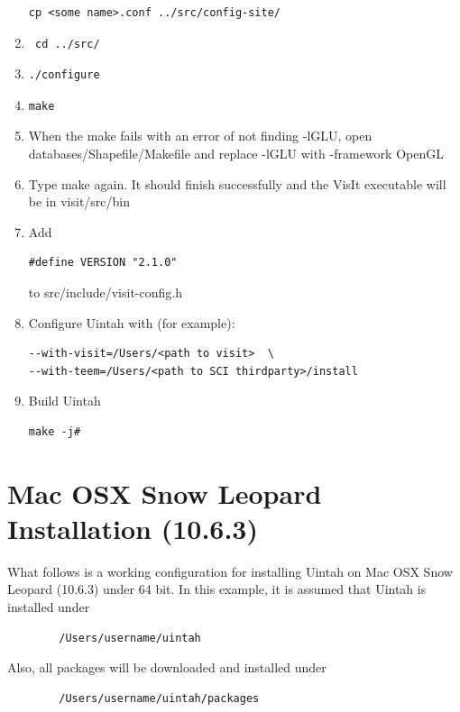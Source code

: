 \documentclass[12pt]{article}
\begin{document}
\begin{enumerate}
\begin{verbatim}
cp <some name>.conf ../src/config-site/
\end{verbatim}
\item \begin{verbatim} cd ../src/ \end{verbatim}
\item \begin{verbatim}./configure \end{verbatim} 
\item \begin{verbatim}make \end{verbatim}
\item When the make fails with an error of not finding -lGLU, open databases/Shapefile/Makefile and replace -lGLU with -framework OpenGL
\item Type make again. It should finish successfully and the VisIt executable will be in visit/src/bin
\item Add 
\begin{verbatim}
#define VERSION "2.1.0"
\end{verbatim}  
to src/include/visit-config.h
\item Configure Uintah with (for example): 
\begin{verbatim}
--with-visit=/Users/<path to visit>  \ 
--with-teem=/Users/<path to SCI thirdparty>/install
\end{verbatim}
\item Build Uintah
\begin{verbatim}
make -j# 
\end{verbatim}
\end{enumerate}  
\section{Mac OSX Snow Leopard Installation (10.6.3)}
	What follows is a working configuration for installing Uintah on Mac OSX Snow Leopard (10.6.3) under 64 bit. In this example, it is assumed that Uintah is installed under
	\begin{verbatim}
		/Users/username/uintah
	\end{verbatim}
	Also, all packages will be downloaded and installed under 
	\begin{verbatim}
		/Users/username/uintah/packages
	\end{verbatim}
\end{document}
